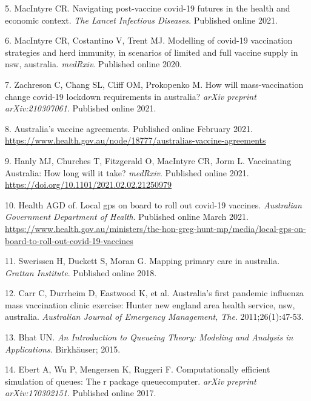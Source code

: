 \documentclass{article}
\begin{document}
\leavevmode\hypertarget{ref-macintyre2021navigating}{}%
5. MacIntyre CR. Navigating post-vaccine covid-19 futures in the health
and economic context. \emph{The Lancet Infectious Diseases}. Published
online 2021.

\leavevmode\hypertarget{ref-macintyre2020modelling}{}%
6. MacIntyre CR, Costantino V, Trent MJ. Modelling of covid-19
vaccination strategies and herd immunity, in scenarios of limited and
full vaccine supply in nsw, australia. \emph{medRxiv}. Published online
2020.

\leavevmode\hypertarget{ref-zachreson2021will}{}%
7. Zachreson C, Chang SL, Cliff OM, Prokopenko M. How will
mass-vaccination change covid-19 lockdown requirements in australia?
\emph{arXiv preprint arXiv:210307061}. Published online 2021.

\leavevmode\hypertarget{ref-vaccineAgreements}{}%
8. Australia's vaccine agreements. Published online February 2021.
\url{https://www.health.gov.au/node/18777/australias-vaccine-agreements}

\leavevmode\hypertarget{ref-hanly2021vaccinating}{}%
9. Hanly MJ, Churches T, Fitzgerald O, MacIntyre CR, Jorm L. Vaccinating
Australia: How long will it take? \emph{medRxiv}. Published online 2021.
\url{https://doi.org/10.1101/2021.02.02.21250979}

\leavevmode\hypertarget{ref-hunt2021local}{}%
10. Health AGD of. Local gps on board to roll out covid-19 vaccines.
\emph{Australian Government Department of Health}. Published online
March 2021.
\url{https://www.health.gov.au/ministers/the-hon-greg-hunt-mp/media/local-gps-on-board-to-roll-out-covid-19-vaccines}

\leavevmode\hypertarget{ref-swerissen2018mapping}{}%
11. Swerissen H, Duckett S, Moran G. Mapping primary care in australia.
\emph{Grattan Institute}. Published online 2018.

\leavevmode\hypertarget{ref-carr2011australia}{}%
12. Carr C, Durrheim D, Eastwood K, et al. Australia's first pandemic
influenza mass vaccination clinic exercise: Hunter new england area
health service, nsw, australia. \emph{Australian Journal of Emergency
Management, The}. 2011;26(1):47-53.

\leavevmode\hypertarget{ref-bhat2015introduction}{}%
13. Bhat UN. \emph{An Introduction to Queueing Theory: Modeling and
Analysis in Applications}. Birkhäuser; 2015.

\leavevmode\hypertarget{ref-ebert2017computationally}{}%
14. Ebert A, Wu P, Mengersen K, Ruggeri F. Computationally efficient
simulation of queues: The r package queuecomputer. \emph{arXiv preprint
arXiv:170302151}. Published online 2017.
\end{document}
